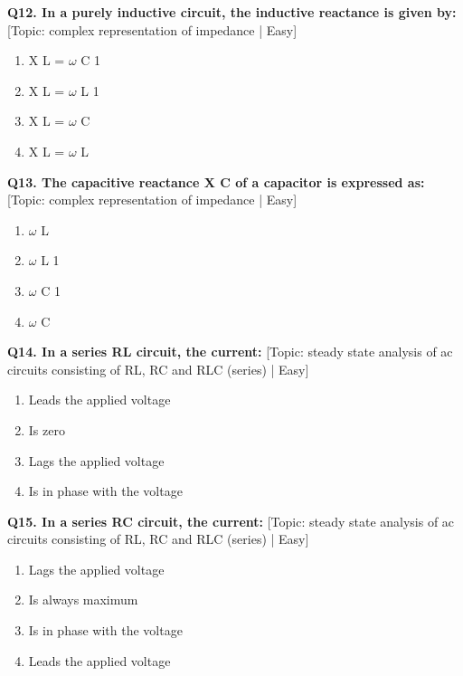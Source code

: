 \noindent\textbf{Q12. In a purely inductive circuit, the inductive reactance is given by:} \hfill [Topic: complex representation of impedance | Easy]
\begin{enumerate}[label=(\alph*),topsep=2pt,itemsep=1pt,partopsep=0pt,parsep=0pt]
    \item {X L = $\omega$ C 1}
    \item {X L = $\omega$ L 1}
    \item {X L = $\omega$ C}
    \item {X L = $\omega$ L}
\end{enumerate}
\vspace{2mm}

\noindent\textbf{Q13. The capacitive reactance X C of a capacitor is expressed as:} \hfill [Topic: complex representation of impedance | Easy]
\begin{enumerate}[label=(\alph*),topsep=2pt,itemsep=1pt,partopsep=0pt,parsep=0pt]
    \item {$\omega$ L}
    \item {$\omega$ L 1}
    \item {$\omega$ C 1}
    \item {$\omega$ C}
\end{enumerate}
\vspace{2mm}

\noindent\textbf{Q14. In a series RL circuit, the current:} \hfill [Topic: steady state analysis of ac circuits consisting of RL, RC and RLC (series) | Easy]
\begin{enumerate}[label=(\alph*),topsep=2pt,itemsep=1pt,partopsep=0pt,parsep=0pt]
    \item {Leads the applied voltage}
    \item {Is zero}
    \item {Lags the applied voltage}
    \item {Is in phase with the voltage}
\end{enumerate}
\vspace{2mm}

\noindent\textbf{Q15. In a series RC circuit, the current:} \hfill [Topic: steady state analysis of ac circuits consisting of RL, RC and RLC (series) | Easy]
\begin{enumerate}[label=(\alph*),topsep=2pt,itemsep=1pt,partopsep=0pt,parsep=0pt]
    \item {Lags the applied voltage}
    \item {Is always maximum}
    \item {Is in phase with the voltage}
    \item {Leads the applied voltage}
\end{enumerate}
\vspace{2mm}

